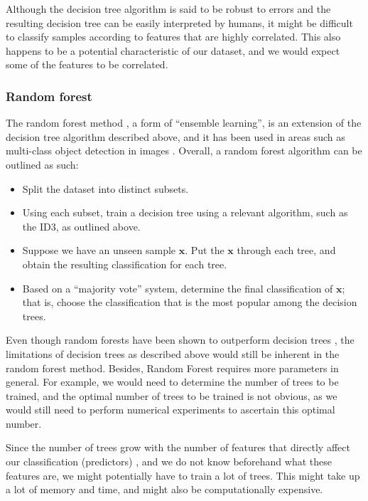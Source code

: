 \documentclass[12pt, twoside, a4paper]{article}
\begin{document}
Although the decision tree algorithm is said to be robust to errors \cite{RefWorks:98} and the resulting decision tree can be easily interpreted by humans, it might be difficult to classify samples according to features that are highly correlated. This also happens to be a potential characteristic of our dataset, and we would expect some of the features to be correlated.

\subsubsection{Random forest}
The random forest method \cite{RefWorks:101}, a form of ``ensemble learning'', is an extension of the decision tree algorithm described above, and it has been used in areas such as multi-class object detection in images \cite{RefWorks:100}. Overall, a random forest algorithm can be outlined as such:
\begin{itemize}
\item Split the dataset into distinct subsets.
\item Using each subset, train a decision tree using a relevant algorithm, such as the ID3, as outlined above.
\item Suppose we have an unseen sample $\boldsymbol x$.  Put the $\boldsymbol x$ through each tree, and obtain the resulting classification for each tree.
\item Based on a ``majority vote'' system, determine the final classification of $\boldsymbol x$; that is, choose the classification that is the most popular among the decision trees.
\end{itemize}

Even though random forests have been shown to outperform decision trees \cite{RefWorks:103}, the limitations of decision trees as described above would still be inherent in the random forest method. Besides, Random Forest requires more parameters in general. For example, we would need to determine the number of trees to be trained, and the optimal number of trees to be trained is not obvious, as we would still need to perform numerical experiments to ascertain this optimal number.

Since the number of trees grow with the number of features that directly affect our classification (predictors) \cite{RefWorks:102}, and we do not know beforehand what these features are, we might potentially have to train a lot of trees. This might take up a lot of memory and time, and might also be computationally expensive.
\end{document}
